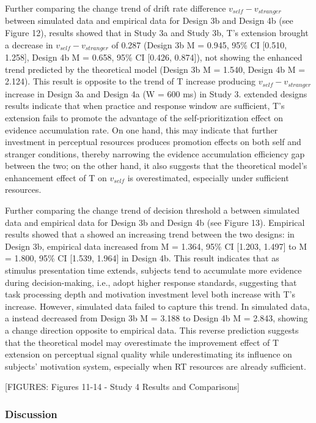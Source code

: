 \documentclass[
  english,
  man,floatsintext]{apa6}
\begin{document}
Further comparing the change trend of drift rate difference \(v_{self} - v_{stranger}\) between simulated data and empirical data for Design 3b and Design 4b (see Figure 12), results showed that in Study 3a and Study 3b, T's extension brought a decrease in \(v_{self} - v_{stranger}\) of 0.287 (Design 3b M = 0.945, 95\% CI {[}0.510, 1.258{]}, Design 4b M = 0.658, 95\% CI {[}0.426, 0.874{]}), not showing the enhanced trend predicted by the theoretical model (Design 3b M = 1.540, Design 4b M = 2.124). This result is opposite to the trend of T increase producing \(v_{self} - v_{stranger}\) increase in Design 3a and Design 4a (W = 600 ms) in Study 3. extended designs results indicate that when practice and response window are sufficient, T's extension fails to promote the advantage of the self-prioritization effect on evidence accumulation rate. On one hand, this may indicate that further investment in perceptual resources produces promotion effects on both self and stranger conditions, thereby narrowing the evidence accumulation efficiency gap between the two; on the other hand, it also suggests that the theoretical model's enhancement effect of T on \(v_{self}\) is overestimated, especially under sufficient resources.

Further comparing the change trend of decision threshold a between simulated data and empirical data for Design 3b and Design 4b (see Figure 13). Empirical results showed that a showed an increasing trend between the two designs: in Design 3b, empirical data increased from M = 1.364, 95\% CI {[}1.203, 1.497{]} to M = 1.800, 95\% CI {[}1.539, 1.964{]} in Design 4b. This result indicates that as stimulus presentation time extends, subjects tend to accumulate more evidence during decision-making, i.e., adopt higher response standards, suggesting that task processing depth and motivation investment level both increase with T's increase. However, simulated data failed to capture this trend. In simulated data, a instead decreased from Design 3b M = 3.188 to Design 4b M = 2.843, showing a change direction opposite to empirical data. This reverse prediction suggests that the theoretical model may overestimate the improvement effect of T extension on perceptual signal quality while underestimating its influence on subjects' motivation system, especially when RT resources are already sufficient.

{[}FIGURES: Figures 11-14 - Study 4 Results and Comparisons{]}

\subsubsection{Discussion}\label{discussion-2}
\end{document}
